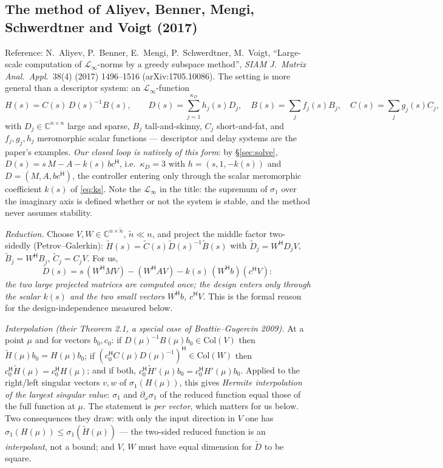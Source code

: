 \documentclass[11pt,a4paper]{article}
\newcommand{\C}{\mathbb{C}}
\newcommand{\hp}{^{\mathsf H}}
\begin{document}
{{\subsection{The method of Aliyev, Benner, Mengi, Schwerdtner and Voigt (2017)}
\label{sec:proj-paper}
Reference: N.~Aliyev, P.~Benner, E.~Mengi, P.~Schwerdtner, M.~Voigt, ``Large-scale
computation of $\mathcal L_\infty$-norms by a greedy subspace method'', \emph{SIAM J.\
Matrix Anal.\ Appl.}\ 38(4) (2017) 1496--1516 (arXiv:1705.10086).  The setting is more
general than a descriptor system: an $\mathcal L_\infty$-function
\[
H(s)=C(s)\,D(s)^{-1}B(s),\qquad
D(s)=\sum_{j=1}^{\kappa_D}h_j(s)D_j,\quad B(s)=\sum_jf_j(s)B_j,\quad C(s)=\sum_jg_j(s)C_j,
\]
with $D_j\in\C^{n\times n}$ large and sparse, $B_j$ tall-and-skinny, $C_j$ short-and-fat,
and $f_j,g_j,h_j$ meromorphic scalar functions --- descriptor and delay systems are the
paper's examples.  \emph{Our closed loop is natively of this form}: by
\S\ref{sec:solve}, $D(s)=s\,M-A-k(s)\,bc\hp$, i.e.\ $\kappa_D=3$ with
$h=(s,1,-k(s))$ and $D=(M,A,bc\hp)$, the controller entering only through the scalar
meromorphic coefficient $k(s)$ of \eqref{eq:ks}.  Note the $\mathcal L_\infty$ in the
title: the supremum of $\sigma_1$ over the imaginary axis is defined whether or not the
system is stable, and the method never assumes stability.

\emph{Reduction.}  Choose $V,W\in\C^{n\times\tilde n}$, $\tilde n\ll n$, and project the
middle factor two-sidedly (Petrov--Galerkin):
$\tilde H(s)=\tilde C(s)\tilde D(s)^{-1}\tilde B(s)$ with $\tilde D_j=W\hp D_jV$,
$\tilde B_j=W\hp B_j$, $\tilde C_j=C_jV$.  For us,
\[
\tilde D(s)=s\,(W\hp MV)-(W\hp AV)-k(s)\,(W\hp b)(c\hp V):
\]
\emph{the two large projected matrices are computed once; the design enters only through
the scalar $k(s)$ and the two small vectors $W\hp b$, $c\hp V$.}  This is the formal
reason for the design-independence measured below.

\emph{Interpolation (their Theorem 2.1, a special case of Beattie--Gugercin 2009).}  At a
point $\mu$ and for vectors $b_0,c_0$: if $D(\mu)^{-1}B(\mu)b_0\in\mathrm{Col}(V)$ then
$\tilde H(\mu)b_0=H(\mu)b_0$; if $(c_0\hp C(\mu)D(\mu)^{-1})\hp\in\mathrm{Col}(W)$ then
$c_0\hp\tilde H(\mu)=c_0\hp H(\mu)$; and if both, $c_0\hp\tilde H'(\mu)b_0=c_0\hp H'(\mu)b_0$.
Applied to the right/left singular vectors $v,w$ of $\sigma_1(H(\mu))$, this gives
\emph{Hermite interpolation of the largest singular value}: $\sigma_1$ and
$\partial_\omega\sigma_1$ of the reduced function equal those of the full function at
$\mu$.  The statement is \emph{per vector}, which matters for us below.  Two consequences
they draw: with only the input direction in $V$ one has $\sigma_1(H(\mu))\le\sigma_1(\tilde H(\mu))$
--- the two-sided reduced function is an \emph{interpolant}, not a bound; and $V$, $W$
must have equal dimension for $\tilde D$ to be square.

}}
\end{document}
